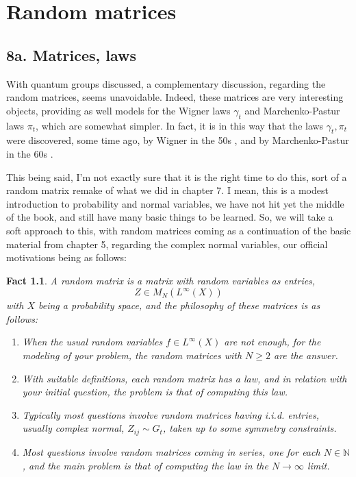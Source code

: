 \documentclass[12pt]{amsbook}
\newtheorem{fact}[theorem]{Fact}
\begin{document}
\chapter{Random matrices}

\section*{8a. Matrices, laws}

With quantum groups discussed, a complementary discussion, regarding the random matrices, seems unavoidable. Indeed, these matrices are very interesting objects, providing as well models for the Wigner laws $\gamma_t$ and Marchenko-Pastur laws $\pi_t$, which are somewhat simpler. In fact, it is in this way that the laws $\gamma_t,\pi_t$ were discovered, some time ago, by Wigner in the 50s \cite{wig}, and by Marchenko-Pastur in the 60s \cite{mpa}.

\bigskip

This being said, I'm not exactly sure that it is the right time to do this, sort of a random matrix remake of what we did in chapter 7. I mean, this is a modest introduction to probability and normal variables, we have not hit yet the middle of the book, and still have many basic things to be learned. So, we will take a soft approach to this, with random matrices coming as a continuation of the basic material from chapter 5, regarding the complex normal variables, our official motivations being as follows:

\begin{fact}
A random matrix is a matrix with random variables as entries,
$$Z\in M_N(L^\infty(X))$$
with $X$ being a probability space, and the philosophy of these matrices is as follows:
\begin{enumerate}
\item When the usual random variables $f\in L^\infty(X)$ are not enough, for the modeling of your problem, the random matrices with $N\geq2$ are the answer.

\item With suitable definitions, each random matrix has a law, and in relation with your initial question, the problem is that of computing this law.

\item Typically most questions involve random matrices having i.i.d. entries, usually complex normal, $Z_{ij}\sim G_t$, taken up to some symmetry constraints.

\item Most questions involve random matrices coming in series, one for each $N\in\mathbb N$, and the main problem is that of computing the law in the $N\to\infty$ limit.
\end{enumerate}
\end{fact}
\end{document}

